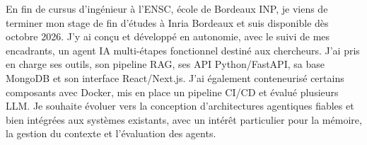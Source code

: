 
\begin{cvparagraph}
En fin de cursus d’ingénieur à l’ENSC, école de Bordeaux INP, je viens de terminer mon stage de fin d’études à Inria Bordeaux et suis disponible dès octobre 2026. J’y ai conçu et développé en autonomie, avec le suivi de mes encadrants, un agent IA multi-étapes fonctionnel destiné aux chercheurs. J’ai pris en charge ses outils, son pipeline RAG, ses API Python/FastAPI, sa base MongoDB et son interface React/Next.js. J’ai également conteneurisé certains composants avec Docker, mis en place un pipeline CI/CD et évalué plusieurs LLM. Je souhaite évoluer vers la conception d’architectures agentiques fiables et bien intégrées aux systèmes existants, avec un intérêt particulier pour la mémoire, la gestion du contexte et l’évaluation des agents.
\end{cvparagraph}
